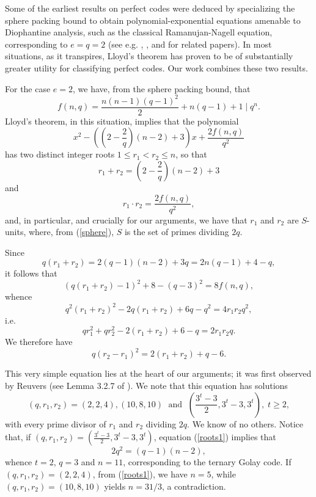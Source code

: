 \documentclass{amsart}
\begin{document}
 Some of the earliest results on perfect codes were deduced by specializing the sphere packing bound to obtain polynomial-exponential equations amenable to Diophantine analysis, such as the classical Ramanujan-Nagell equation, corresponding to $e=q=2$ (see e.g. \cite{Alt}, \cite{Coh}, \cite{Gol} and \cite{SS} for related papers). In most situations, as it transpires, Lloyd's theorem has proven to be of substantially greater utility for classifying perfect codes. Our work combines these two results.
 
For the case $e=2$, we have,
from the sphere packing bound, that
\begin{equation} \label{sphere}
f(n,q)=\frac{n(n-1)(q-1)^2}{2}+n(q-1)+1 \mid q^n.
\end{equation}
Lloyd's theorem, in this situation, implies that the polynomial
\begin{equation} \label{poly}
x^2 - \left( \left( 2 -\frac{2}{q} \right) (n-2) +3 \right)x+\frac{2f(n,q)}{q^2}
\end{equation}
has two distinct integer roots $1 \leq r_1 < r_2 \leq n$, so that
\begin{equation} \label{roots1}
r_1+r_2=\left( 2 -\frac{2}{q} \right) (n-2) +3
\end{equation}
and
\begin{equation} \label{roots2}
r_1 \cdot r_2=\frac{2f(n,q)}{q^2},
\end{equation}
and, in particular, and crucially for our arguments, we have that $r_1$ and $r_2$ are $S$-units, where, from (\ref{sphere}), $S$ is the set of primes dividing $2q$.

Since
$$
q(r_1+r_2)=2(q-1)(n-2)+3q=2n(q-1)+4-q,
$$
it follows that
$$
(q(r_1+r_2)-1)^2+8-(q-3)^2=8f(n,q),
$$
whence
$$
q^2(r_1+r_2)^2-2q(r_1+r_2)+6q-q^2=4 r_1 r_2 q^2,
$$
i.e.
$$
q r_1^2+q r_2^2-2(r_1+r_2)+6-q=2 r_1 r_2 q.
$$
We therefore have
\begin{equation} \label{good}
q (r_2-r_1)^2 = 2(r_1+r_2) +q-6.
\end{equation}

This very simple equation lies at the heart of our arguments; it was first observed by Reuvers  (see Lemma 3.2.7 of \cite{Reu}).
We note that this equation has solutions 
\begin{equation} \label{exxies}
(q,r_1,r_2) = (2,2,4), (10,8,10) \; \mbox{ and } \; \left( \frac{3^t-3}{2}, 3^t-3,3^t \right), \; t \geq 2,
\end{equation}
with every prime divisor of $r_1$ and $r_2$ dividing $2q$. We know of no others.
Notice that, if $(q,r_1,r_2) = \left( \frac{3^t-3}{2}, 3^t-3,3^t \right)$, equation (\ref{roots1}) implies that
$$
2q^2 = (q-1) (n-2),
$$
whence $t=2$, $q=3$ and $n=11$, corresponding to the ternary Golay code. If $(q,r_1,r_2) = (2,2,4)$, from (\ref{roots1}), we have
$n=5$, while $(q,r_1,r_2) = (10,8,10)$ yields $n=31/3$, a contradiction.
\end{document}
